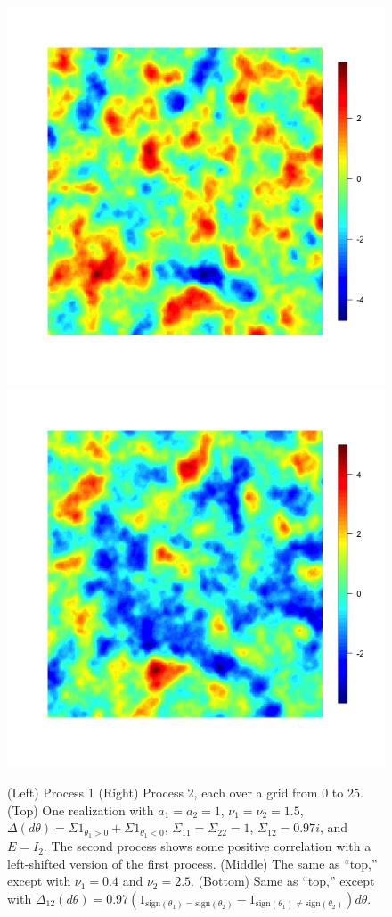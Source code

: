 \documentclass[11pt]{article}
\begin{document}
\begin{figure}
\includegraphics[scale = .35]{../simu_spatial5.png}
\includegraphics[scale = .35]{../simu_spatial6.png}
\caption{(Left) Process 1 (Right) Process 2, each over a grid from $0$ to $25$. (Top) One realization with $a_1 = a_2 = 1$, $\nu_1 = \nu_2 = 1.5$, $\Delta(d\theta) = \Sigma 1_{\theta_1 > 0}  +\overline{\Sigma} 1_{\theta_1 < 0}$, $\Sigma_{11} = \Sigma_{22} = 1$, $\Sigma_{12} = 0.97i$, and $E = I_2$. The second process shows some positive correlation with a left-shifted version of the first process. (Middle) The same as ``top,'' except with $\nu_1 = 0.4$ and $\nu_2 = 2.5$. (Bottom) Same as ``top,'' except with $\Delta_{12}(d\theta) = 0.97( 1_{\textrm{sign}(\theta_1) = \textrm{sign}(\theta_2)}-1_{\textrm{sign}(\theta_1) \neq \textrm{sign}(\theta_2)}) d\theta$.} %

\end{figure}
\end{document}
